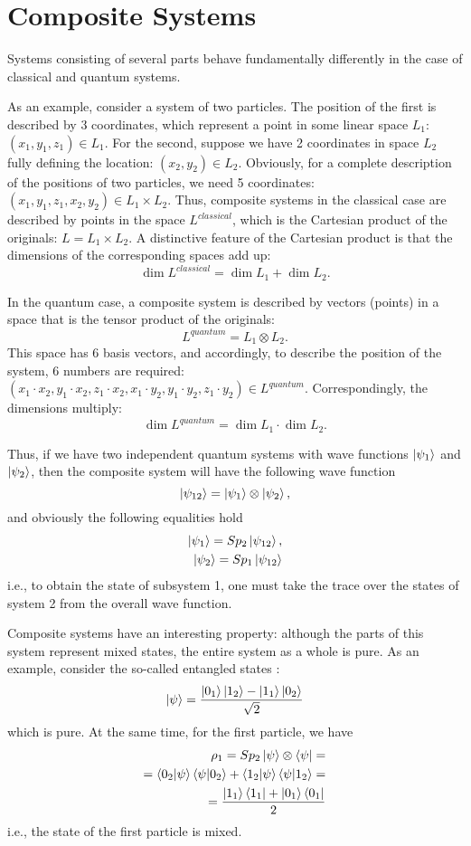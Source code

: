 \section{Composite Systems}
\label{sec:add:quantum:composite}
Systems consisting of several parts behave fundamentally differently
in the case of classical and quantum systems.

As an example, consider a system of two particles. The position of the first
is described by 3 coordinates, which represent a point in
some linear space $L_1$: $(x_1, y_1, z_1) \in L_1$. For the second,
suppose we have 2 coordinates in space $L_2$ fully defining
the location:  
$(x_2, y_2) \in L_2$. Obviously, for a complete description of the positions of two
particles, we need 5 coordinates: $(x_1, y_1, z_1, x_2, y_2) \in L_1
\times L_2$. Thus, composite systems in the classical case
are described by points in the space $L^{classical}$, which is the Cartesian
product of the originals: $L = L_1 \times L_2$. A distinctive
feature of the Cartesian product is that the dimensions
of the corresponding spaces add up:
\[
\dim{L^{classical}} = \dim{L_1} + \dim{L_2}.
\] 

In the quantum case, a composite system is described by vectors (points) in
a space that is the tensor product of the originals: 
\[
L^{quantum} = L_1 \otimes L_2.
\]
This space has 6 basis vectors, and accordingly, to
describe the position of the system, 6 numbers are required:
$(x_1 \cdot x_2, y_1 \cdot x_2, z_1 \cdot x_2, 
x_1 \cdot y_2, y_1 \cdot y_2, z_1 \cdot y_2) \in L^{quantum}$. 
Correspondingly, the dimensions multiply:
\[
\dim{L^{quantum}} = \dim{L_1} \cdot \dim{L_2}.
\] 

Thus, if we have two independent quantum systems with
wave functions $\ket{\psi_1}$ and $\ket{\psi_2}$, then the composite
system will have the following wave function
\[
\ket{\psi_{12}} = \ket{\psi_1} \otimes \ket{\psi_2},
\]
and obviously the following equalities hold
\begin{eqnarray}
\ket{\psi_1} = Sp_2 \ket{\psi_{12}}, \\
\nonumber
\ket{\psi_2} = Sp_1 \ket{\psi_{12}} 
\nonumber
\end{eqnarray}
i.e., to obtain the state of subsystem 1, one must take the trace over
the states of system 2 from the overall wave function. 

Composite systems have an interesting property: although
the parts of this system represent mixed states, the entire system
as a whole is pure. As an example, consider the so-called entangled states :
\[
\ket{\psi} = \frac{\ket{0_1}\ket{1_2} - \ket{1_1}\ket{0_2}}{\sqrt{2}}
\]
which is pure. At the same time, for the first particle, we have
\begin{eqnarray}
\rho_1 = Sp_2 \ket{\psi} \otimes \bra{\psi} = 
\nonumber \\
=
\bra{0_2}\ket{\psi}\bra{\psi}\ket{0_2} + 
\bra{1_2}\ket{\psi}\bra{\psi}\ket{1_2} = 
\nonumber \\
= \frac{\ket{1_1}\bra{1_1} + 
\ket{0_1}\bra{0_1}}{2}
\nonumber
\end{eqnarray}
i.e., the state of the first particle is mixed.

